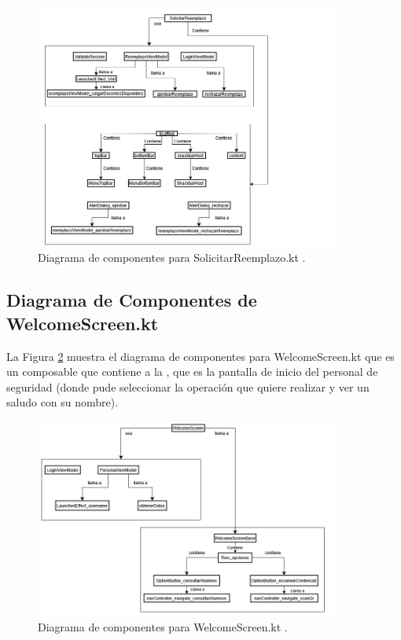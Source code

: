 \begin{figure}[htbp!]
	\begin{center}
		\includegraphics[width=0.9\textwidth]{DiagramasMoviles/DCM (32)}
		\caption{Diagrama de componentes para SolicitarReemplazo.kt .}
		\label{fig:Componentes_19}
	\end{center}
\end{figure}

\newpage

\subsection{Diagrama de Componentes de WelcomeScreen.kt}

La Figura \ref{fig:Componentes_20} muestra el diagrama de componentes para WelcomeScreen.kt que es un composable que contiene a la , que es la pantalla de inicio del personal de seguridad (donde pude seleccionar la operación que quiere realizar y ver un saludo con su nombre).

\begin{figure}[htbp!]
	\begin{center}
		\includegraphics[width=0.9\textwidth]{DiagramasMoviles/DCM (33)}
		\caption{Diagrama de componentes para WelcomeScreen.kt .}
		\label{fig:Componentes_20}
	\end{center}
\end{figure}

